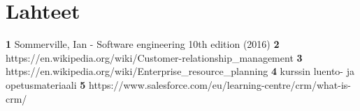 \chapter{Lahteet}
\label{lahteet}
\thispagestyle{fancy}

\textbf{1} Sommerville, Ian - Software engineering 10th edition (2016)
\textbf{2} https://en.wikipedia.org/wiki/Customer-relationship_management
\textbf{3} https://en.wikipedia.org/wiki/Enterprise_resource_planning
\textbf{4} kurssin luento- ja opetusmateriaali
\textbf{5} https://www.salesforce.com/eu/learning-centre/crm/what-is-crm/
